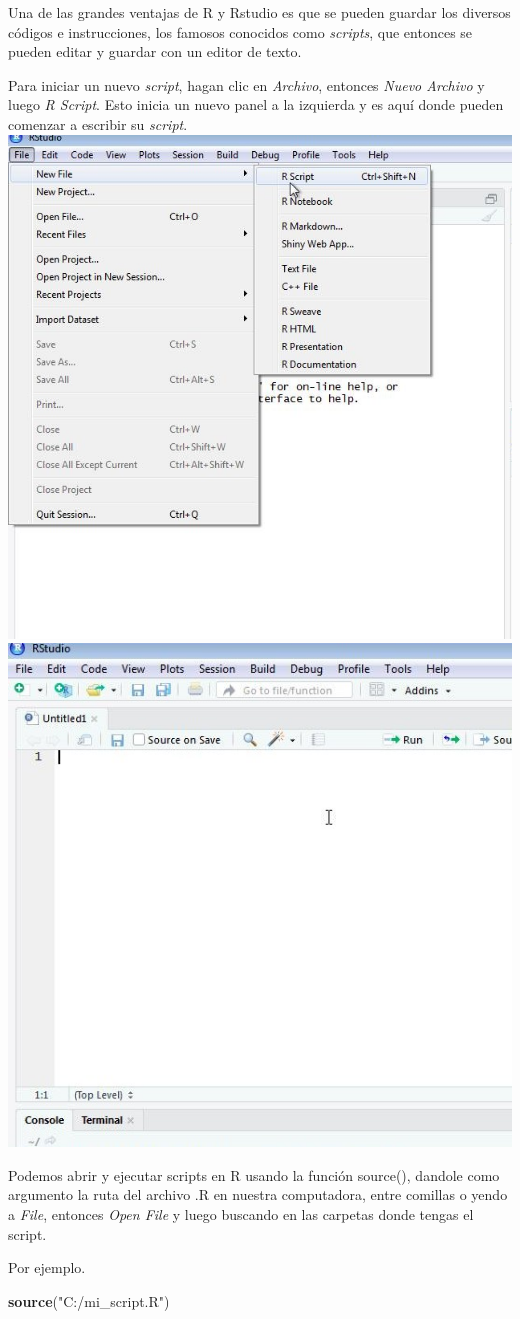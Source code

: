 \documentclass[
]{book}
\newenvironment{Shaded}{\begin{snugshade}}{\end{snugshade}}
\newcommand{\FunctionTok}[1]{\textcolor[rgb]{0.13,0.29,0.53}{\textbf{#1}}}
\newcommand{\NormalTok}[1]{#1}
\newcommand{\StringTok}[1]{\textcolor[rgb]{0.31,0.60,0.02}{#1}}
\begin{document}
Una de las grandes ventajas de R y Rstudio es que se pueden guardar los diversos códigos e instrucciones, los famosos conocidos como \emph{scripts}, que entonces se pueden editar y guardar con un editor de texto.

Para iniciar un nuevo \emph{script}, hagan clic en \emph{Archivo}, entonces \emph{Nuevo Archivo} y luego \emph{R Script}.
Esto inicia un nuevo panel a la izquierda y es aquí donde pueden comenzar a escribir su \emph{script}.\\

\includegraphics[width=0.5\linewidth]{images/script}
\includegraphics[width=0.5\linewidth]{images/script2}

\hfill\break

Podemos abrir y ejecutar scripts en R usando la función source(), dandole como argumento la ruta del archivo .R en nuestra computadora, entre comillas o yendo a \emph{File}, entonces \emph{Open File} y luego buscando en las carpetas donde tengas el script.

Por ejemplo.

\begin{Shaded}
\begin{Highlighting}[]
\FunctionTok{source}\NormalTok{(}\StringTok{"C:/mi\_script.R"}\NormalTok{)}
\end{Highlighting}
\end{Shaded}
\end{document}

